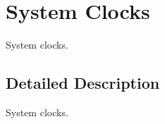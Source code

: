 \hypertarget{group__tms570__clock}{}\section{System Clocks}
\label{group__tms570__clock}


System clocks.  




\subsection{Detailed Description}
System clocks. 

